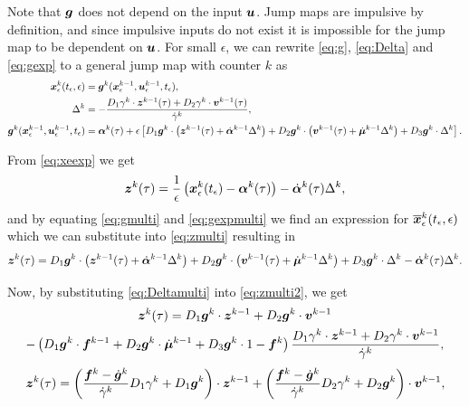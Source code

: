 \documentclass[../DC2017114Bouma.tex]{subfiles}
\begin{document}
Note that ${\boldsymbol{g}}$ does not depend on the input ${\boldsymbol{u}}$. Jump maps are impulsive by definition, and since impulsive inputs do not exist it is impossible for the jump map to be dependent on ${\boldsymbol{u}}$. For small $\epsilon$, we can rewrite \eqref{eq:g}, \eqref{eq:Delta} and \eqref{eq:gexp} to a general jump map with counter $k$ as
\begin{align}
{\boldsymbol{x}}^{k}_\epsilon(t_\epsilon,\epsilon) &= {\boldsymbol{g}}^k({\boldsymbol{x}}^{k-1}_\epsilon,{\boldsymbol{u}}^{k-1}_\epsilon,t_\epsilon),\label{eq:gmulti}\\
\Delta^{k} &= -\frac{D_1 \gamma^{k}\cdot {\boldsymbol{z}}^{k-1}(\tau) + D_2 \gamma^{k}\cdot {\boldsymbol{v}}^{k-1}(\tau)}{\dot{\gamma}^{k}}, \label{eq:Deltamulti}\\
{\boldsymbol{g}}^k({\boldsymbol{x}}^{k-1}_\epsilon,{\boldsymbol{u}}^{k-1}_\epsilon,t_\epsilon) &= \boldsymbol{\alpha}^k(\tau) + \epsilon\left[D_1{\boldsymbol{g}}^k\cdot \left({\boldsymbol{z}}^{k-1} (\tau) + \dot{\boldsymbol{\alpha}}^{k-1}\Delta^k \right) + D_2{\boldsymbol{g}}^k\cdot \left({\boldsymbol{v}}^{k-1} (\tau) + \dot{\boldsymbol{\mu}}^{k-1}\Delta^k \right) + D_3{\boldsymbol{g}}^k\cdot \Delta^k \right].\label{eq:gexpmulti}
\end{align}

From \eqref{eq:xeexp} we get
\begin{align}
{\boldsymbol{z}}^k(\tau) = \frac{1}{\epsilon}\left({\boldsymbol{x}}^{k}_\epsilon(t_\epsilon) - \boldsymbol{\alpha}^k(\tau)\right) -\dot{\boldsymbol{\alpha}}^k(\tau)\Delta^k,\label{eq:zmulti}
\end{align}
and by equating \eqref{eq:gmulti} and \eqref{eq:gexpmulti} we find an expression for $\overline{{\boldsymbol{x}}}^{k}_\epsilon(t_\epsilon,\epsilon)$ which we can substitute into \eqref{eq:zmulti} resulting in
\begin{align}
{\boldsymbol{z}}^k(\tau) = D_1{\boldsymbol{g}}^k\cdot\left({\boldsymbol{z}}^{k-1} (\tau) + \dot{\boldsymbol{\alpha}}^{k-1}\Delta^k \right) + D_2{\boldsymbol{g}}^k\cdot \left({\boldsymbol{v}}^{k-1} (\tau) + \dot{\boldsymbol{\mu}}^{k-1}\Delta^k \right) + D_3{\boldsymbol{g}}^k\cdot\Delta^k -\dot{\boldsymbol{\alpha}}^k(\tau)\Delta^k. \label{eq:zmulti2}
\end{align}

Now, by substituting \eqref{eq:Deltamulti} into \eqref{eq:zmulti2}, we get
\begin{multline}
{\boldsymbol{z}}^k(\tau) = D_1{\boldsymbol{g}}^k\cdot{\boldsymbol{z}}^{k-1} + D_2{\boldsymbol{g}}^k\cdot{\boldsymbol{v}}^{k-1} \\- \left(D_1{\boldsymbol{g}}^k\cdot {\boldsymbol{f}}^{k-1} + D_2{\boldsymbol{g}}^k\cdot \dot{\boldsymbol{\mu}}^{k-1} + D_3{\boldsymbol{g}}^k\cdot 1 - {\boldsymbol{f}}^k\right)\frac{D_1\gamma^k\cdot{\boldsymbol{z}}^{k-1} + D_2\gamma^k\cdot{\boldsymbol{v}}^{k-1}}{\dot{\gamma}^k},
\end{multline}
\begin{align}
{\boldsymbol{z}}^k(\tau) = \left(\frac{{\boldsymbol{f}}^k - \dot{{\boldsymbol{g}}}^k}{\dot{\gamma}^k}D_1\gamma^k + D_1{\boldsymbol{g}}^k \right)\cdot{\boldsymbol{z}}^{k-1} + \left(\frac{{\boldsymbol{f}}^k - \dot{{\boldsymbol{g}}}^k}{\dot{\gamma}^k}D_2\gamma^k + D_2{\boldsymbol{g}}^k \right)\cdot{\boldsymbol{v}}^{k-1},\label{eq:zmulti3}
\end{align}
\end{document}
